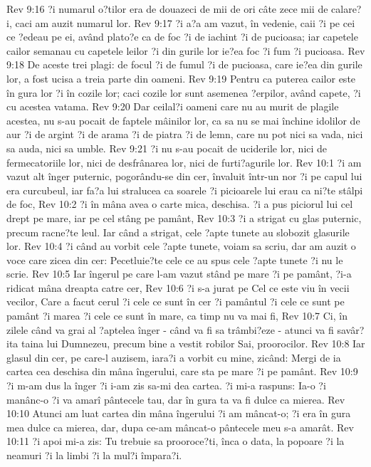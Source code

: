 Rev 9:16  ?i numarul o?tilor era de douazeci de mii de ori câte zece mii de calare?i, caci am auzit numarul lor.
Rev 9:17  ?i a?a am vazut, în vedenie, caii ?i pe cei ce ?edeau pe ei, având plato?e ca de foc ?i de iachint ?i de pucioasa; iar capetele cailor semanau cu capetele leilor ?i din gurile lor ie?ea foc ?i fum ?i pucioasa.
Rev 9:18  De aceste trei plagi: de focul ?i de fumul ?i de pucioasa, care ie?ea din gurile lor, a fost ucisa a treia parte din oameni.
Rev 9:19  Pentru ca puterea cailor este în gura lor ?i în cozile lor; caci cozile lor sunt asemenea ?erpilor, având capete, ?i cu acestea vatama.
Rev 9:20  Dar ceilal?i oameni care nu au murit de plagile acestea, nu s-au pocait de faptele mâinilor lor, ca sa nu se mai închine idolilor de aur ?i de argint ?i de arama ?i de piatra ?i de lemn, care nu pot nici sa vada, nici sa auda, nici sa umble.
Rev 9:21  ?i nu s-au pocait de uciderile lor, nici de fermecatoriile lor, nici de desfrânarea lor, nici de furti?agurile lor.
Rev 10:1  ?i am vazut alt înger puternic, pogorându-se din cer, învaluit într-un nor ?i pe capul lui era curcubeul, iar fa?a lui stralucea ca soarele ?i picioarele lui erau ca ni?te stâlpi de foc,
Rev 10:2  ?i în mâna avea o carte mica, deschisa. ?i a pus piciorul lui cel drept pe mare, iar pe cel stâng pe pamânt,
Rev 10:3  ?i a strigat cu glas puternic, precum racne?te leul. Iar când a strigat, cele ?apte tunete au slobozit glasurile lor.
Rev 10:4  ?i când au vorbit cele ?apte tunete, voiam sa scriu, dar am auzit o voce care zicea din cer: Pecetluie?te cele ce au spus cele ?apte tunete ?i nu le scrie.
Rev 10:5  Iar îngerul pe care l-am vazut stând pe mare ?i pe pamânt, ?i-a ridicat mâna dreapta catre cer,
Rev 10:6  ?i s-a jurat pe Cel ce este viu în vecii vecilor, Care a facut cerul ?i cele ce sunt în cer ?i pamântul ?i cele ce sunt pe pamânt ?i marea ?i cele ce sunt în mare, ca timp nu va mai fi,
Rev 10:7  Ci, în zilele când va grai al ?aptelea înger - când va fi sa trâmbi?eze - atunci va fi savâr?ita taina lui Dumnezeu, precum bine a vestit robilor Sai, proorocilor.
Rev 10:8  Iar glasul din cer, pe care-l auzisem, iara?i a vorbit cu mine, zicând: Mergi de ia cartea cea deschisa din mâna îngerului, care sta pe mare ?i pe pamânt.
Rev 10:9  ?i m-am dus la înger ?i i-am zis sa-mi dea cartea. ?i mi-a raspuns: Ia-o ?i manânc-o ?i va amarî pântecele tau, dar în gura ta va fi dulce ca mierea.
Rev 10:10  Atunci am luat cartea din mâna îngerului ?i am mâncat-o; ?i era în gura mea dulce ca mierea, dar, dupa ce-am mâncat-o pântecele meu s-a amarât.
Rev 10:11  ?i apoi mi-a zis: Tu trebuie sa prooroce?ti, înca o data, la popoare ?i la neamuri ?i la limbi ?i la mul?i împara?i.
